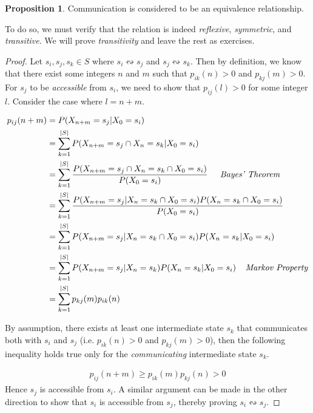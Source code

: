 \documentclass[a4paper,12pt]{article}
\theoremstyle{definition}
\newtheorem{proposition}{Proposition}[subsection]
\begin{document}
	\begin{proposition}
		Communication is considered to be an equivalence relationship.
	\end{proposition}
	To do so, we must verify that the relation is indeed \emph{reflexive}, \emph{symmetric}, and \emph{transitive}. 
	We will prove \emph{transitivity} and leave the rest as exercises. 
		\begin{proof}	
		Let $s_i, s_j, s_k \in S$ where $s_i \leftrightsquigarrow s_j$ and $s_j \leftrightsquigarrow s_k$.
		Then by definition, we know that there exist some integers $n$ and $m$ such that 
		$p_{ik}(n) > 0$ and $p_{kj}(m) > 0$. For $s_j$ to be \emph{accessible} from $s_i$, we need to show that 
		$p_{ij}(l) > 0$ for some integer $l$. Consider the case where $l = n+m$.

	\begin{equation*}
		\begin{aligned}
			p_{ij}(n+m) &= P(X_{n+m} = s_j | X_0 = s_i) \\
						&= \sum_{k=1}^{|S|} P(X_{n+m} = s_j \cap X_n = s_k | X_0 = s_i) \\
						&= \sum_{k=1}^{|S|} \frac{P(X_{n+m} = s_j \cap X_n = s_k \cap X_0 = s_i)}{P(X_0 = s_i)}\ \;\;\;\; \emph{Bayes' Theorem} \\
						&= \sum_{k=1}^{|S|} \frac{P(X_{n+m} = s_j | X_n = s_k \cap X_0 = s_i)P(X_n = s_k \cap X_0 = s_i)}{P(X_0 = s_i)}\ \\
						&= \sum_{k=1}^{|S|} P(X_{n+m} = s_j | X_n = s_k \cap X_0 = s_i)P(X_n = s_k | X_0 = s_i) \\
						&= \sum_{k=1}^{|S|} P(X_{n+m} = s_j | X_n = s_k)P(X_n = s_k | X_0 = s_i) \;\;\;\; \emph{Markov Property} \\ 
						&= \sum_{k=1}^{|S|} p_{kj}(m)p_{ik}(n) \\
		\end{aligned}
	\end{equation*}	
	
	By assumption, there exists at least one intermediate state $s_k$ that communicates both with $s_i$ and $s_j$ (i.e. $p_{ik}(n) > 0$ 
	and $p_{kj}(m) > 0$), then the following inequality holds true only for the \emph{communicating} intermediate state $s_k$.

	\begin{equation*}
	\begin{aligned}
		 p_{ij}(n+m) \geq p_{ik}(m)p_{kj}(n) > 0
	\end{aligned}
	\end{equation*}	
	Hence $s_j$ is accessible from $s_i$. A similar argument can be made in the other direction to show that $s_i$ is accessible from $s_j$,
	thereby proving $s_i \leftrightsquigarrow s_j$.
	\end{proof}
\end{document}
